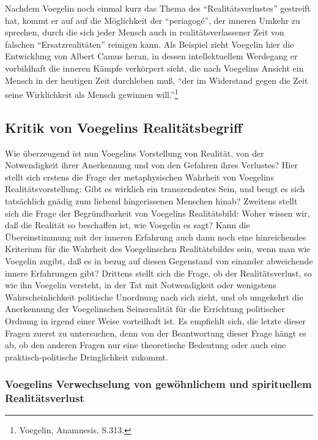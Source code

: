 Nachdem Voegelin noch einmal kurz das Thema des "`Realitätsverlustes"'
gestreift hat, kommt er auf auf die Möglichkeit der "`periagogé"', der
inneren Umkehr zu sprechen, durch die sich jeder Mensch auch in
realitätsverlassener Zeit von falschen "`Ersatzrealitäten"' reinigen kann. Als
Beispiel zieht Voegelin hier die Entwicklung von Albert Camus heran, in dessen
intellektuellem Werdegang er vorbildhaft die inneren Kämpfe verkörpert sieht,
die nach Voegelins Ansicht ein Mensch in der heutigen Zeit durchleben muß,
"`der im Widerstand gegen die Zeit seine Wirklichkeit als Mensch gewinnen
will."'\footnote{Voegelin, Anamnesis, S.313.}

\subsection{Kritik von Voegelins Realitätsbegriff}
 
Wie überzeugend ist nun Voegelins Vorstellung von Realität, von der
Notwendigkeit ihrer Anerkennung und von den Gefahren ihres Verlustes? Hier
stellt sich erstens die Frage der metaphysischen Wahrheit von Voegelins
Realitätsvorstellung: Gibt es wirklich ein transzendentes Sein, und beugt es
sich tatsächlich gnädig zum liebend hingerissenen Menschen hinab? Zweitens
stellt sich die Frage der Begründbarkeit von Voegelins Realitätsbild: Woher
wissen wir, daß die Realität so beschaffen ist, wie Voegelin es sagt? Kann die
Übereinstimmung mit der inneren Erfahrung auch dann noch eine hinreichendes
Kriterium für die Wahrheit des Voegelinschen Realitätsbildes sein, wenn man
wie Voegelin zugibt, daß es in bezug auf diesen Gegenstand von einander
abweichende innere Erfahrungen gibt? Drittens stellt sich die Frage, ob der
Realitätsverlust, so wie ihn Voegelin versteht, in der Tat mit Notwendigkeit
oder wenigstens Wahrscheinlichkeit politische Unordnung nach sich zieht, und
ob umgekehrt die Anerkennung der Voegelinschen Seinsrealität für die
Errichtung politischer Ordnung in irgend einer Weise vorteilhaft ist. Es
empfiehlt sich, die letzte dieser Fragen zuerst zu untersuchen, denn von der
Beantwortung dieser Frage hängt es ab, ob den anderen Fragen nur eine
theoretische Bedeutung oder auch eine praktisch-politische Dringlichkeit
zukommt.

\subsubsection{Voegelins Verwechselung von gewöhnlichem und spirituellem Realitätsverlust}

